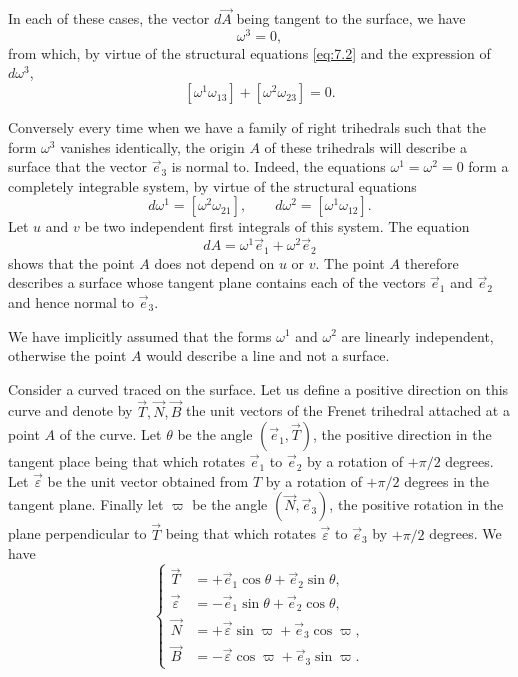 \documentclass[leqno,11pt]{book}
\numberwithin{equation}{chapter}
\theoremstyle{shape1}
\theoremstyle{shape0}
\theoremstyle{shape2}
\theoremstyle{definition}
\begin{document}
In each of these cases, the vector $d \vec A$ being tangent to the surface, we have
\begin{equation}
  \label{eq:7.4}
  \omega^{3}=0,
\end{equation}
from which, by virtue of the structural equations \eqref{eq:7.2} and the expression of $d\omega^{3}$,
\begin{equation}
  \label{eq:7.5}
  [\omega^{1}\omega_{13}]+[\omega^{2}\omega_{23}]=0.
\end{equation}

Conversely every time when we have a family of right trihedrals such that the form $\omega^{3}$ vanishes identically, the origin $A$ of these trihedrals will describe a surface that the vector $\vec e_{3}$ is normal to. Indeed, the equations $\omega^{1}=\omega^{2}=0$ form a completely integrable system, by virtue of the structural equations
\[
d\omega^{1}=[\omega^{2}\omega_{21}],\qquad d\omega^{2}=[\omega^{1}\omega_{12}].
\]
Let $u$ and $v$ be two independent first integrals of this system. The equation
\[
dA=\omega^{1}\vec e_{1}+\omega^{2}\vec e_{2}
\]
shows that the point $A$ does not depend on $u$ or $v$. The point $A$ therefore describes a surface whose tangent plane contains each of the vectors $\vec e_{1}$ and $\vec e_{2}$ and hence normal to $\vec e_{3}$.

We have implicitly assumed that the forms $\omega^{1}$ and $\omega^{2}$ are linearly independent, otherwise the point $A$ would describe a line and not a surface.




\vspace{12pt}\fsec Consider a curved traced on the surface. Let us define a positive direction on this curve and denote by $\vec T, \vec N, \vec B$ the unit vectors of the Frenet trihedral attached at a point $A$ of the curve. Let $\theta$ be the angle $(\vec e_{1},\vec T)$, the positive direction in the tangent place being that which rotates $\vec e_{1}$ to $\vec e_{2}$ by a rotation of $+\pi/2$ degrees. Let $\vec\varepsilon$ be the unit vector obtained from $T$ by a rotation of $+\pi/2$ degrees in the tangent plane. Finally let $\varpi$ be the angle $(\vec N,\vec e_{3})$, the positive rotation in the plane perpendicular to $\vec T$ being that which rotates $\vec \varepsilon$ to $\vec e_{3}$ by $+\pi/2$ degrees. We have
\begin{equation}
  \label{eq:7.6}
  \left\{
    \begin{aligned}
      \vec T&=+\vec e_{1}\cos\theta+\vec e_{2}\sin\theta,\\
      \vec\varepsilon&=-\vec e_{1}\sin\theta+\vec e_{2}\cos\theta,\\
      \vec N&=+\vec\varepsilon\sin\varpi+\vec e_{3}\cos\varpi,\\
      \vec B&=-\vec\varepsilon\cos\varpi+\vec e_{3}\sin\varpi.
    \end{aligned}
  \right.
\end{equation}
\end{document}
